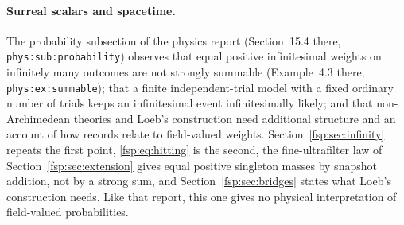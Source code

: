 \documentclass[11pt,a4paper]{article}
\numberwithin{equation}{section}
\theoremstyle{definition}
\theoremstyle{remark}
\begin{document}
\paragraph{Surreal scalars and spacetime.}
The probability subsection of the physics report \cite{repophys}
(Section~15.4 there, \nolinkurl{phys:sub:probability}) observes that equal
positive infinitesimal weights on infinitely many outcomes are not strongly
summable (Example~4.3 there, \nolinkurl{phys:ex:summable}); that a finite
independent-trial model with a fixed ordinary number of trials keeps an
infinitesimal event infinitesimally likely; and that non-Archimedean theories
\cite{bhw} and Loeb's construction \cite{loeb} need additional structure and an
account of how records relate to field-valued weights. Section~\ref{fsp:sec:infinity}
repeats the first point, \eqref{fsp:eq:hitting} is the second, the
fine-ultrafilter law of Section~\ref{fsp:sec:extension} gives equal positive
singleton masses by snapshot addition, not by a strong sum, and
Section~\ref{fsp:sec:bridges} states what Loeb's construction needs. Like that
report, this one gives no physical interpretation of field-valued probabilities.
\end{document}
